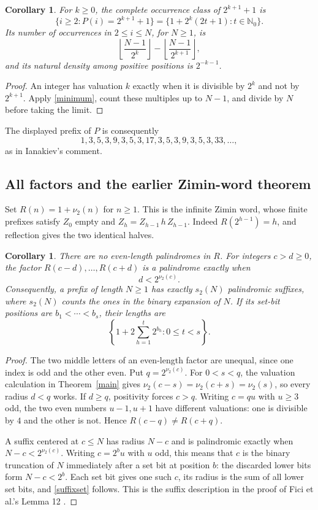 \documentclass[11pt]{article}
\newtheorem{corollary}[theorem]{Corollary}
\newcommand{\vv}{\nu_2}
\newcommand{\NN}{\mathbb N}
\begin{document}
\begin{corollary}\label{classes}
For $k\ge0$, the complete occurrence class of $2^{k+1}+1$ is
\[
 \{i\ge2:P(i)=2^{k+1}+1\}
   =\{1+2^k(2t+1):t\in\NN_0\}.
\]
Its number of occurrences in $2\le i\le N$, for $N\ge1$, is
\[
 \left\lfloor\frac{N-1}{2^k}\right\rfloor
 -\left\lfloor\frac{N-1}{2^{k+1}}\right\rfloor,
\]
and its natural density among positive positions is $2^{-k-1}$.
\end{corollary}
\begin{proof}
An integer has valuation $k$ exactly when it is divisible by $2^k$
and not by $2^{k+1}$. Apply \eqref{minimum}, count these multiples up
to $N-1$, and divide by $N$ before taking the limit.
\end{proof}

The displayed prefix of $P$ is consequently
\[
 1,3,5,3,9,3,5,3,17,3,5,3,9,3,5,3,33,\ldots,
\]
as in Ianakiev's comment.

\subsection{All factors and the earlier Zimin-word theorem}
Set $R(n)=1+\vv(n)$ for $n\ge1$. This is the infinite Zimin word,
whose finite prefixes satisfy $Z_0$ empty and $Z_h=Z_{h-1}\,h\,Z_{h-1}$.
Indeed $R(2^{h-1})=h$, and reflection gives the two identical halves.

\begin{corollary}\label{allfactors}
There are no even-length palindromes in $R$. For integers $c>d\ge0$,
the factor $R(c-d),\ldots,R(c+d)$ is a palindrome exactly when
\[
 d<2^{\vv(c)}.
\]
Consequently, a prefix of length $N\ge1$ has exactly $s_2(N)$
palindromic suffixes, where $s_2(N)$ counts the ones in the binary
expansion of $N$. If its set-bit positions are $b_1<\cdots<b_s$,
their lengths are
\begin{equation}\label{suffixset}
 \left\{1+2\sum_{h=1}^{t}2^{b_h}:0\le t<s\right\}.
\end{equation}
\end{corollary}
\begin{proof}
The two middle letters of an even-length factor are unequal, since one
index is odd and the other even. Put $q=2^{\vv(c)}$.
For $0<s<q$, the valuation calculation in Theorem~\ref{main} gives
$\vv(c-s)=\vv(c+s)=\vv(s)$, so every radius $d<q$ works.
If $d\ge q$, positivity forces $c>q$. Writing $c=qu$ with $u\ge3$
odd, the two even numbers $u-1,u+1$ have different valuations: one is
divisible by $4$ and the other is not. Hence $R(c-q)\ne R(c+q)$.

A suffix centered at $c\le N$ has radius $N-c$ and is palindromic
exactly when $N-c<2^{\vv(c)}$. Writing $c=2^b u$ with $u$ odd,
this means that $c$ is the binary truncation of $N$ immediately after
a set bit at position $b$: the discarded lower bits form $N-c<2^b$.
Each set bit gives one such $c$, its radius is the sum of all lower
set bits, and \eqref{suffixset} follows. This is the suffix description
in the proof of Fici et al.'s Lemma 12 \cite{fgkk}.
\end{proof}
\end{document}
